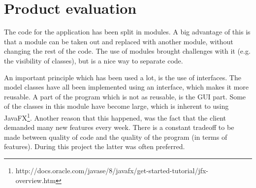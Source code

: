 \section{Product evaluation}
\par
The code for the application has been split in modules. A big advantage of this is that a module can be taken out and replaced with another module, without changing the rest of the code. The use of modules brought challenges with it (e.g. the visibility of classes), but is a nice way to separate code. 
\par
An important principle which has been used a lot, is the use of interfaces. The model classes have all been implemented using an interface, which makes it more reusable. 
A part of the program which is not as reusable, is the GUI part. Some of the classes in this module have become large, which is inherent to using JavaFX\footnote{http://docs.oracle.com/javase/8/javafx/get-started-tutorial/jfx-overview.htm}. Another reason that this happened, was the fact that the client demanded many new features every week. There is a constant tradeoff to be made between quality of code and the quality of the program (in terms of features). During this project the latter was often preferred.